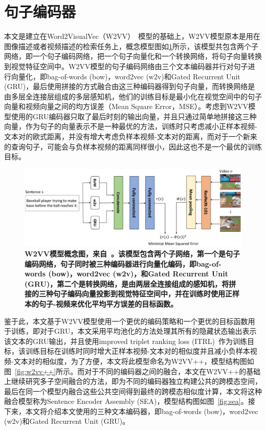 \section{句子编码器}
本文是建立在Word2VisualVec（W2VV）~\cite{dong2018predicting}模型的基础上，W2VV模型原本是用在图像描述或者视频描述的检索任务上，概念模型图如\ref{fig:base-w2vv}所示，该模型共包含两个子网络，即一个句子编码网络，把一个句子向量化和一个转换网络，将句子向量转换到视觉特征空间中。W2VV模型的句子编码网络由三个文本编码器并行对句子进行向量化，即bag-of-words (bow)，word2vec (w2v)和Gated Recurrent Unit (GRU)，最后使用拼接的方式融合由这三种编码器得到句子向量，而转换网络是由多层全连接层组成的多层感知机，他们的训练目标是最小化在视觉空间中的句子向量和视频向量之间的均方误差（Mean Square Error，MSE）。考虑到W2VV模型使用的GRU编码器只取了最后时刻的输出向量，并且只通过简单地拼接这三种向量，作为句子的向量表示不是一种最优的方法，训练时只考虑减小正样本视频-文本对的欧式距离，并没有增大考虑负样本视频-文本对的距离，而对于一个新来的查询句子，可能会与负样本视频的距离同样很小，因此这也不是一个最优的训练目标。
\begin{figure}[tbh!]
    \centering
    \includegraphics[width=\linewidth]{figures/w2vv-model}
    \caption[Dong等人~\cite{dong2018predicting}提出的W2VV模型的概念图]{\textbf{W2VV模型概念图，来自~\cite{li2017multi}。该模型包含两个子网络，第一个是句子编码网络，句子同时被三种编码器进行向量化编码，即bag-of-words (bow)，word2vec (w2v)，和Gated Recurrent Unit (GRU)，第二个是转换网络，是由两层全连接组成的感知机，将拼接的三种句子编码向量投影到视觉特征空间中，并在训练时使用正样本的句子-视频来优化平均平方误差的目标函数。}}
    \label{fig:base-w2vv}
\end{figure}

鉴于此，本文基于W2VV模型使用一个更优的编码策略和一个更优的目标函数用于训练，即对于GRU，本文采用平均池化的方法处理其所有的隐藏状态输出表示该文本的GRU输出，并且使用improved triplet ranking loss (ITRL)~\cite{faghri2017vse++}作为训练目标，该训练目标在训练时同时增大正样本视频-文本对的相似度并且减小负样本视频-文本对的相似度，为了方便，本文将此模型命名为W2VV++，模型结构图如图~\ref{fig:w2vv++}所示。而对于不同的编码器之间的融合，本文在W2VV++的基础上继续研究多子空间融合的方法，即为不同的编码器独立构建公共的跨模态空间，最后在同一个模型内融合这些公共空间得到最终的跨模态相似度计算，本文将这种融合模型称为Sentence Encoder Assembly (SEA)，模型结构图如图~\ref{fig:sea}。接下来，本文将介绍本文使用的三种文本编码器，即bag-of-words (bow)，word2vec (w2v)和Gated Recurrent Unit (GRU)。


